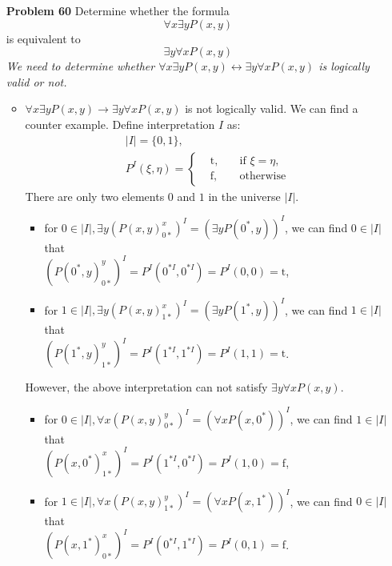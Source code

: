 \begin{enumerate}
\item[\textbf{Problem 60}] Determine whether the formula 
\begin{equation*}
      \forall x \exists y P(x, y)
\end{equation*}
is equivalent to 
\begin{equation*}
      \exists y \forall x P(x, y)
\end{equation*}
\textit{We need to determine whether $\forall x \exists y P(x, y) \leftrightarrow  \exists y \forall x P(x, y)$ is logically valid or not.} 
\begin{itemize}
\item $\forall x \exists y P(x, y) \rightarrow  \exists y \forall x P(x, y)$ is not logically valid.
We can find a counter example. Define interpretation $I$ as:
\begin{equation*}
\begin{gathered}
|I| = \{0, 1\}, \\
P^I(\xi, \eta) = 
\left\{
        \begin{array}{ccc}      
        &\mathrm{t}, \quad &\text{if }  \xi = \eta, \\
        &\mathrm{f}, \quad &\text{otherwise}
        \end{array}\right.     
\end{gathered}
\end{equation*} 
There are only two elements $0$ and $1$ in the universe $|I|$.
\begin{itemize}
\item for $0 \in |I|, \exists y (P(x, y)_{0*}^x)^I = (\exists y P(0^*, y))^I$, we can find $0 \in |I|$ that \\
$(P(0^*, y)_{0*}^y)^I = P^I(0^{*I}, 0^{*I}) = P^I(0, 0) = \mathrm{t}$,
\item for $1 \in |I|, \exists y (P(x, y)_{1*}^x)^I = (\exists y P(1^*, y))^I$, we can find $1 \in |I|$ that \\
$(P(1^*, y)_{1*}^y)^I = P^I(1^{*I}, 1^{*I}) = P^I(1, 1) = \mathrm{t}$. 
\end{itemize}
However, the above interpretation can not satisfy $\exists y \forall x P(x, y)$. 
\begin{itemize}
\item for $0 \in |I|, \forall x (P(x, y)_{0*}^y)^I = (\forall x P(x, 0^*))^I$, we can find $1 \in |I|$
that  \\
$(P(x, 0^*)_{1*}^x)^I = P^I(1^{*I}, 0^{*I}) = P^I(1, 0) = \mathrm{f}$,
\item for $1 \in |I|, \forall x (P(x, y)_{1*}^y)^I = (\forall x P(x, 1^*))^I$, we can find $0 \in |I|$  that \\
$(P(x, 1^*)_{0*}^x)^I = P^I(0^{*I}, 1^{*I}) = P^I(0, 1) = \mathrm{f}$. 
\end{itemize}


\end{itemize}
\end{enumerate}
